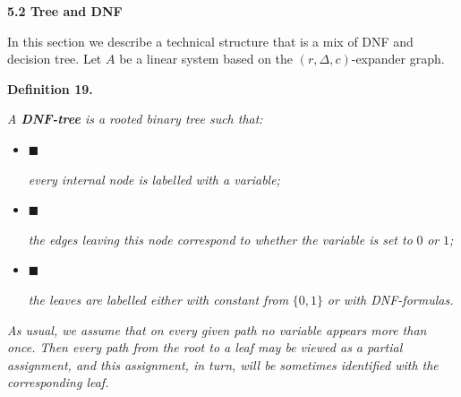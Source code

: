 \par\medskip\noindent\textbf{
5.2 Tree and DNF}\par




In this section we describe a technical structure that is a mix of DNF and decision tree. Let $A$ be a
linear system based on the $(r,\Delta,c)$-expander graph.\par





\par\medskip\noindent\textbf{
\textbf{Definition 19}\textbf{.}
}\par



\emph{A \textbf{DNF-tree} is a rooted binary tree such that:}\par


\begin{itemize}


\item[] 
$\blacksquare$ 


\emph{every internal node is labelled with a variable;}\par





\item[] 
$\blacksquare$ 


\emph{the edges leaving this node correspond to whether the variable is set to }$0$\emph{ or }$1$\emph{;}\par





\item[] 
$\blacksquare$ 


\emph{the leaves are labelled either with constant from }$\{0,1\}$\emph{ or with DNF-formulas.}\par





\end{itemize}




\emph{As usual, we assume that on every given path no variable appears more than once. Then every path from
the root to a leaf may be viewed as a partial assignment, and this assignment, in turn, will be
sometimes identified with the corresponding leaf.}\par




